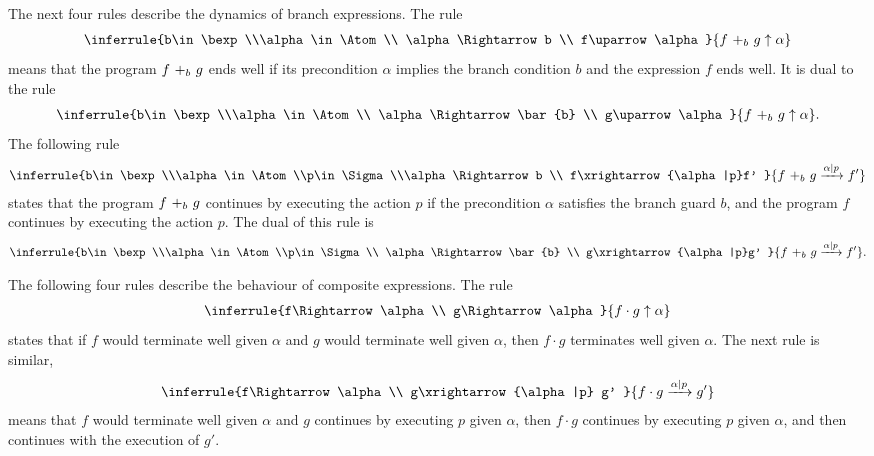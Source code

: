 The next four rules describe the dynamics of branch expressions. The rule
\begin{align}
    \inferrule
    {b\in \bexp\\\alpha\in \Atom \\ \alpha \Rightarrow b \\ f\uparrow \alpha }
    {\branch{b}{f}{g}\uparrow \alpha}    
\end{align}
means that the program $\branch{b}{f}{g}$ ends well if its precondition $\alpha$ implies the branch condition $b$ and the expression $f$ ends well. It is dual to the rule
\begin{align}
    \label{eq:SideChannels:NegGuard}
    \inferrule
    {b\in \bexp\\\alpha\in \Atom \\ \alpha \Rightarrow \bar{b} \\ g\uparrow \alpha }
    {\branch{b}{f}{g}\uparrow \alpha}.    
\end{align}
The following rule
\begin{align}
    \inferrule
    {b\in \bexp\\\alpha\in \Atom \\p\in \Sigma \\\alpha \Rightarrow b \\ f\xrightarrow{\alpha|p}f' }
    {\branch{b}{f}{g}\xrightarrow{\alpha|p} f'}
\end{align}
states that the program $\branch{b}{f}{g}$ continues by executing the action $p$ if the precondition $\alpha$ satisfies the branch guard $b$, and the program $f$ continues by executing the action $p$. The dual of this rule is 
\begin{align}
    \inferrule
    {b\in \bexp\\\alpha\in \Atom \\p\in \Sigma\\ \alpha \Rightarrow \bar{b} \\ g\xrightarrow{\alpha|p}g' }
    {\branch{b}{f}{g}\xrightarrow{\alpha|p} f'}.    
\end{align}

The following four rules describe the behaviour of composite expressions. The rule
\begin{align}
    \inferrule
    {f\Rightarrow \alpha\\ g\Rightarrow \alpha }
    {f\cdot g\uparrow \alpha}    
\end{align}
states that if $f$ would terminate well given $\alpha$ and $g$ would terminate well given $\alpha$, then $f\cdot g$ terminates well given $\alpha$. The next rule is similar, 
\begin{align}
    \label{eq:SideChannels:EndFst}
    \inferrule
    {f\Rightarrow \alpha\\ g\xrightarrow{\alpha|p} g' }
    {f\cdot g\xrightarrow{\alpha|p} g'}    
\end{align}
means that $f$ would terminate well given $\alpha$ and $g$ continues by executing $p$ given $\alpha$, then $f\cdot g$ continues by executing $p$ given $\alpha$, and then continues with the execution of $g'$.

